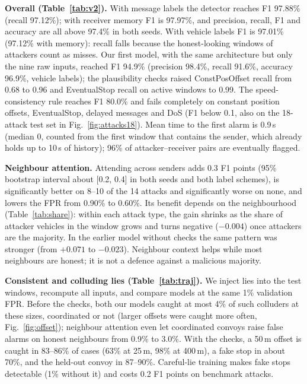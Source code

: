 \documentclass[conference]{IEEEtran}
\begin{document}



\textbf{Overall (Table~\ref{tab:v2}).} With message labels the detector reaches F1 97.88\% (recall 97.12\%); with receiver memory F1 is 97.97\%, and
precision, recall, F1 and accuracy are all above 97.4\% in both seeds. With vehicle labels F1 is 97.01\% (97.12\% with memory): recall falls because the honest-looking
windows of attackers count as misses. Our first model, with the same architecture but only the nine raw inputs, reached F1 94.9\% (precision 98.4\%,
recall 91.6\%, accuracy 96.9\%, vehicle labels); the plausibility checks raised ConstPosOffset recall from 0.68 to 0.96 and EventualStop recall
on active windows to 0.99. The speed-consistency rule reaches F1 80.0\% and fails completely on constant position offsets, EventualStop, delayed messages and
DoS (F1 below 0.1, also on the 18-attack test set in Fig.~\ref{fig:attacks18}). Mean time to the first alarm is 0.9\,s (median 0, counted from the first window that contains the sender, which
already holds up to 10\,s of history); 96\% of attacker--receiver pairs are eventually flagged.

\textbf{Neighbour attention.} Attending across senders adds 0.3 F1 points (95\% bootstrap interval about [0.2, 0.4] in both seeds and both label
schemes), is significantly better on 8--10 of the 14 attacks and significantly worse on none, and lowers the FPR from 0.90\% to 0.60\%. Its benefit
depends on the neighbourhood (Table~\ref{tab:share}): within each attack type, the gain shrinks as the share of attacker vehicles in the window
grows and turns negative ($-0.004$) once attackers are the majority. In the earlier model without checks the same pattern was stronger (from
$+0.071$ to $-0.023$). Neighbour context helps while most neighbours are honest; it is not a defence against a malicious majority.

\textbf{Consistent and colluding lies (Table~\ref{tab:traj}).} We inject lies into the test windows, recompute all inputs, and compare models at
the same 1\% validation FPR. Before the checks, both our models caught at most 4\% of such colluders at these sizes, coordinated or not (larger offsets were caught more often, Fig.~\ref{fig:offset}); neighbour attention even
let coordinated convoys raise false alarms on honest neighbours from 0.9\% to 3.0\%. With the checks, a 50\,m offset is caught in 83--86\% of
cases (63\% at 25\,m, 98\% at 400\,m), a fake stop in about 70\%, and the held-out convoy in 87--90\%. Careful-lie training makes fake
stops detectable (1\% without it) and costs 0.2 F1 points on benchmark attacks.
\end{document}
